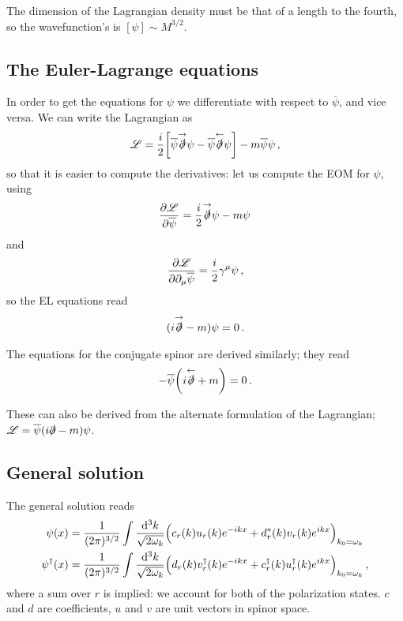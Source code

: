 \documentclass[main.tex]{subfiles}
\begin{document}
The dimension of the Lagrangian density must be that of a length to the fourth, so the wavefunction's is \([\psi ] \sim M^{3/2}\).

\subsection{The Euler-Lagrange equations}

In order to get the equations for \(\psi \) we differentiate with respect to \(\overline{\psi}\), and vice versa. We can write the Lagrangian as 
%
\begin{align}
\mathscr{L} = \frac{i}{2} \qty[ \overline{\psi} \overset{\rightarrow}{\slashed{\partial}} \psi - \overline{\psi} \overset{\leftarrow}{\slashed{\partial}} \psi  ] - m \overline{\psi} \psi 
\,,
\end{align}
%
so that it is easier to compute the derivatives: let us compute the EOM for \(\psi \), using 
%
\begin{align}
\pdv{\mathscr{L}}{\overline{\psi}} = \frac{i}{2} \overset{\rightarrow}{\slashed{\partial}} \psi - m \psi 
\,
\end{align}
%
and 
%
\begin{align}
\pdv{\mathscr{L}}{\partial_{\mu } \overline{\psi}}
= \frac{i}{2} \gamma^{\mu } \psi 
\,,
\end{align}
%
so the EL equations read 
%
\begin{align}
(i \overset{\rightarrow}{\slashed{\partial}} - m) \psi = 0
\,.
\end{align}

The equations for the conjugate spinor are derived similarly; they read 
%
\begin{align}
- \overline{\psi} \qty(i \overset{\leftarrow}{\slashed{\partial}} + m) = 0
\,.
\end{align}

\begin{claim}
These can also be derived from the alternate formulation of the Lagrangian; \(\mathscr{L} = \overline{\psi} (i \slashed{\partial} - m) \psi \). 
\end{claim}

\subsection{General solution}

The general solution reads 
%
\begin{subequations}
\begin{align} \label{eq:dirac-general-solution}
\psi (x) &= \frac{1}{(2 \pi )^{3/2}}
\int \frac{ \dd[3]{k}}{\sqrt{2 \omega_{k}}}
\qty(c_r (k) u_r (k) e^{-ikx} + d^{*}_{r} (k) v_r (k) e^{ikx})_{k_0 = \omega_{k}}  \\
\psi ^\dag (x) &= \frac{1}{(2 \pi )^{3/2}}
\int \frac{ \dd[3]{k}}{\sqrt{2 \omega_{k}}}
\qty(d_r (k) v_r ^\dag (k) e^{-ikx} + c ^\dag_{r} (k) u_r ^\dag (k) e^{ikx})_{k_0 = \omega_{k}}  
\,,
\end{align}
\end{subequations}
%
where a sum over \(r\) is implied: we account for both of the polarization states. 
\(c\) and \(d\) are coefficients, \(u\) and \(v\) are unit vectors in spinor space.
\end{document}

